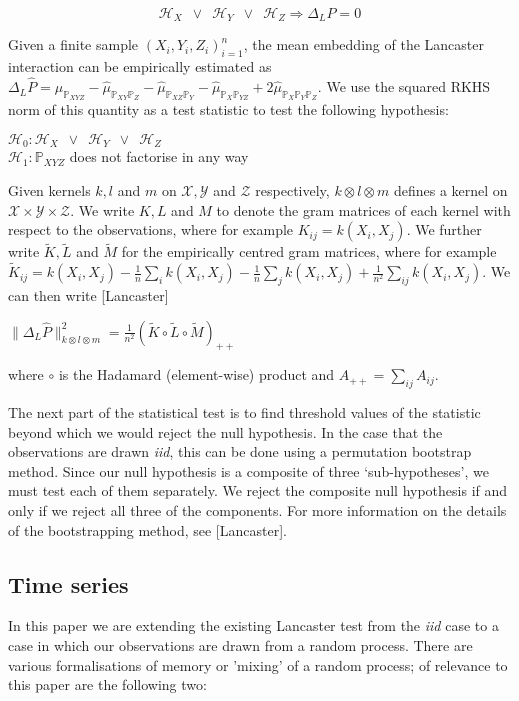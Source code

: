 \documentclass{article}
\begin{document}
\[\mathcal{H}_X \enspace \lor \enspace \mathcal{H}_Y \enspace \lor \enspace \mathcal{H}_Z \Rightarrow \Delta_LP=0 \]

Given a finite sample $(X_i,Y_i,Z_i)_{i=1}^n$, the mean embedding of the Lancaster interaction can be empirically estimated as $\Delta_L\hat{P} = \hat{\mu}_{\mathbb{P}_{XYZ}} - \hat{\mu}_{\mathbb{P}_{XY}\mathbb{P}_{Z}} - \hat{\mu}_{\mathbb{P}_{XZ}\mathbb{P}_{Y}} - \hat{\mu}_{\mathbb{P}_{X}\mathbb{P}_{YZ}} + 2\hat{\mu}_{\mathbb{P}_{X}\mathbb{P}_{Y}\mathbb{P}_{Z}}$. We use the squared RKHS norm of this quantity as a test statistic to test the following hypothesis:

$\mathcal{H}_0: \mathcal{H}_X \enspace \lor \enspace \mathcal{H}_Y \enspace \lor \enspace \mathcal{H}_Z $\\
$\mathcal{H}_1: \mathbb{P}_{XYZ}$ does not factorise in any way

Given kernels $k,l$ and $m$ on $\mathcal{X},\mathcal{Y}$ and $\mathcal{Z}$ respectively, $k\otimes l \otimes m$ defines a kernel on $\mathcal{X}\times \mathcal{Y} \times \mathcal{Z}$. We write $K, L$ and $M$ to denote the gram matrices of each kernel with respect to the observations, where for example $K_{ij} = k(X_i,X_j)$. We further write $\tilde{K}, \tilde{L}$ and $\tilde{M}$ for the empirically centred gram matrices, where for example $\tilde{K}_{ij} = k(X_i,X_j) - \frac{1}{n}\sum_ik(X_i,X_j)  - \frac{1}{n}\sum_jk(X_i,X_j) + \frac{1}{n^2}\sum_{ij}k(X_i,X_j)$. We can then write [Lancaster]

$\|\Delta_L\hat{P}\|_{k\otimes l \otimes m}^2 = \frac{1}{n^2}\left(\tilde{K}\circ\tilde{L}\circ\tilde{M}\right)_{++}$

where $\circ$ is the Hadamard (element-wise) product and $A_{++} = \sum_{ij}A_{ij}$.

The next part of the statistical test is to find threshold values of the statistic beyond which we would reject the null hypothesis. In the case that the observations are drawn \emph{iid}, this can be done using a permutation bootstrap method. Since our null hypothesis is a composite of three `sub-hypotheses', we must test each of them separately. We reject the composite null hypothesis if and only if we reject all three of the components. For more information on the details of the bootstrapping method, see [Lancaster].

\subsection{Time series}
In this paper we are extending the existing Lancaster test from the \emph{iid} case to a case in which our observations are drawn from a random process. There are various formalisations of memory or 'mixing' of a random process; of relevance to this paper are the following two:
\end{document}
